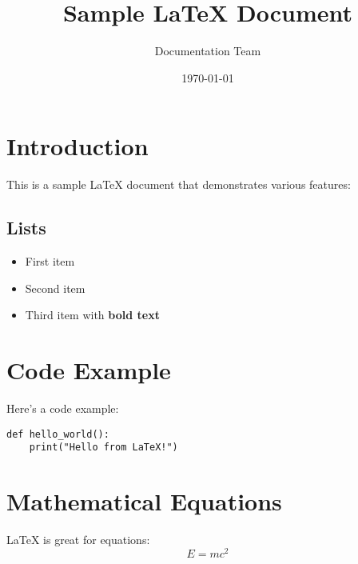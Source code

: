 \documentclass{article}
\title{Sample LaTeX Document}
\author{Documentation Team}
\date{\today}
\begin{document}
\maketitle

\section{Introduction}
This is a sample LaTeX document that demonstrates various features:

\subsection{Lists}
\begin{itemize}
    \item First item
    \item Second item
    \item Third item with \textbf{bold text}
\end{itemize}

\section{Code Example}
Here's a code example:
\begin{verbatim}
def hello_world():
    print("Hello from LaTeX!")
\end{verbatim}

\section{Mathematical Equations}
LaTeX is great for equations:
\[ E = mc^2 \]
\end{document}
